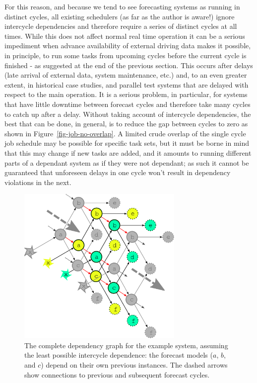 \documentclass[11pt,a4paper]{article}
\begin{document}
For this reason, and because we tend to see forecasting systems as
running in distinct cycles, all existing schedulers (as far as the
author is aware!) ignore intercycle dependencies and therefore require a
series of distinct cycles at all times. While this does not affect
normal real time operation it can be a serious impediment when advance
availability of external driving data makes it possible, in principle,
to run some tasks from upcoming cycles before the current cycle is
finished - as suggested at the end of the previous section. This occurs
after delays (late arrival of external data, system maintenance, etc.)
and, to an even greater extent, in historical case studies, and parallel
test systems that are delayed with respect to the main operation. It is
a serious problem, in particular, for systems that have little downtime
between forecast cycles and therefore take many cycles to catch up
after a delay. Without taking account of intercycle dependencies, the
best that can be done, in general, is to reduce the gap between cycles
to zero as shown in Figure~\ref{fig-job-no-overlap}. A limited crude
overlap of the single cycle job schedule may be possible for specific
task sets, but it must be borne in mind that this may change if new
tasks are added, and it amounts to running different parts of a
dependant system as if they were not dependant; as such it cannot be
guaranteed that unforeseen delays in one cycle won't result in
dependency violations in the next.

\begin{figure} \label{fig-dep-multi}
    \begin{center}
        \includegraphics[width=8cm]{inkscape-svg/dep-multi-cycle} 
    \end{center}
    \caption[Complete multicycle dependency graph]{\small The complete
    dependency graph for the example system, assuming the least possible
    intercycle dependence: the forecast models ($a$, $b$, and $c$)
    depend on their own previous instances. The dashed arrows show
    connections to previous and subsequent forecast cycles.} 
\end{figure}
\end{document}
